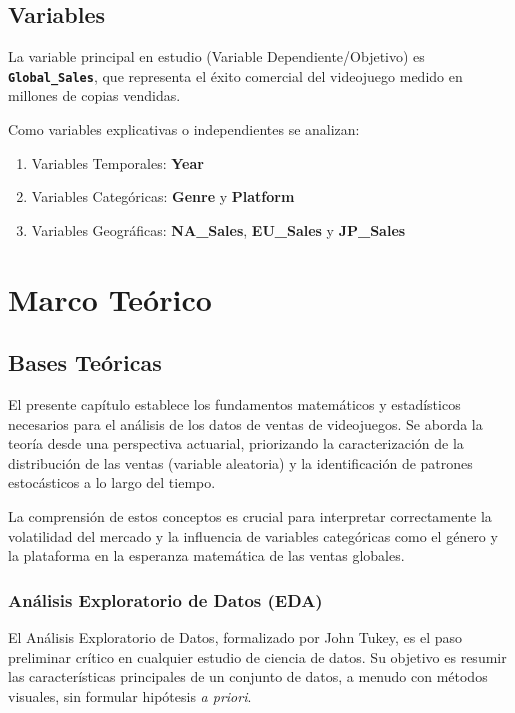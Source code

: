 \documentclass[oneside,11pt]{Latex/Classes/PhDthesisPSnPDF}
\begin{document}
\section{Variables}

La variable principal en estudio (Variable Dependiente/Objetivo) es
\textbf{\texttt{Global\_Sales}}, que representa el éxito comercial del
videojuego medido en millones de copias vendidas.

Como variables explicativas o independientes se analizan:

\begin{enumerate}
  \item Variables Temporales: \textbf{Year}
  \item Variables Categóricas: \textbf{Genre} y \textbf{Platform}
  \item Variables Geográficas: \textbf{NA\_Sales}, \textbf{EU\_Sales} y \textbf{JP\_Sales}
\end{enumerate}

\chapter{Marco Teórico}

\section{Bases Teóricas}

El presente capítulo establece los fundamentos matemáticos y
estadísticos necesarios para el análisis de los datos de ventas de
videojuegos. Se aborda la teoría desde una perspectiva actuarial,
priorizando la caracterización de la distribución de las ventas
(variable aleatoria) y la identificación de patrones estocásticos a lo
largo del tiempo.

La comprensión de estos conceptos es crucial para interpretar
correctamente la volatilidad del mercado y la influencia de variables
categóricas como el género y la plataforma en la esperanza matemática de
las ventas globales.

\subsection{Análisis Exploratorio de Datos (EDA)}

El Análisis Exploratorio de Datos, formalizado por John Tukey, es el
paso preliminar crítico en cualquier estudio de ciencia de datos. Su
objetivo es resumir las características principales de un conjunto de
datos, a menudo con métodos visuales, sin formular hipótesis \emph{a
priori}.
\end{document}
